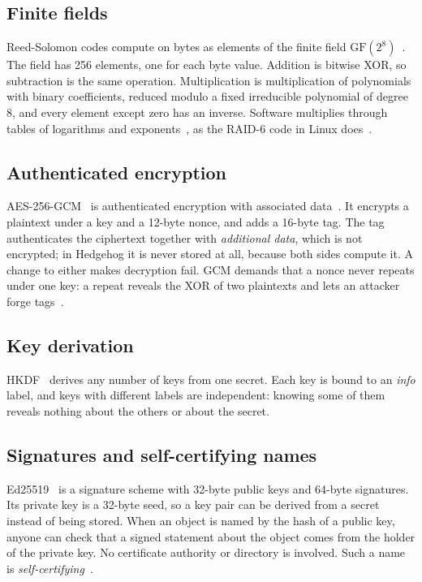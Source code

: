 \documentclass[10pt,a4paper,final]{article}
\begin{document}
\subsection{Finite fields}

Reed-Solomon codes compute on bytes as elements of the finite field $\mathrm{GF}(2^8)$~\cite{macwilliams1977}. The
field has 256 elements, one for each byte value. Addition is bitwise XOR, so subtraction is the same operation.
Multiplication is multiplication of polynomials with binary coefficients, reduced modulo a fixed irreducible
polynomial of degree 8, and every element except zero has an inverse. Software multiplies through tables of
logarithms and exponents~\cite{rizzo1997,plank1997}, as the RAID-6 code in Linux does~\cite{anvin2004}.

\subsection{Authenticated encryption}

AES-256-GCM~\cite{fips197,sp80038d,mcgrew2004} is authenticated encryption with associated
data~\cite{rogaway2002}. It encrypts a plaintext under a key and a 12-byte nonce, and adds a 16-byte tag. The tag
authenticates the ciphertext together with \emph{additional data}, which is not encrypted; in Hedgehog it is never
stored at all, because both sides compute it. A change to either makes decryption fail. GCM demands that a nonce
never repeats under one key: a repeat reveals the XOR of two plaintexts and lets an attacker forge
tags~\cite{joux2006}.

\subsection{Key derivation}

HKDF~\cite{rfc5869,krawczyk2010} derives any number of keys from one secret. Each key is bound to an \emph{info}
label, and keys with different labels are independent: knowing some of them reveals nothing about the others or
about the secret.

\subsection{Signatures and self-certifying names}

Ed25519~\cite{rfc8032,bernstein2012} is a signature scheme with 32-byte public keys and 64-byte signatures. Its
private key is a 32-byte seed, so a key pair can be derived from a secret instead of being stored. When an object is
named by the hash of a public key, anyone can check that a signed statement about the object comes from the holder
of the private key. No certificate authority or directory is involved. Such a name is
\emph{self-certifying}~\cite{mazieres1999}.
\end{document}
